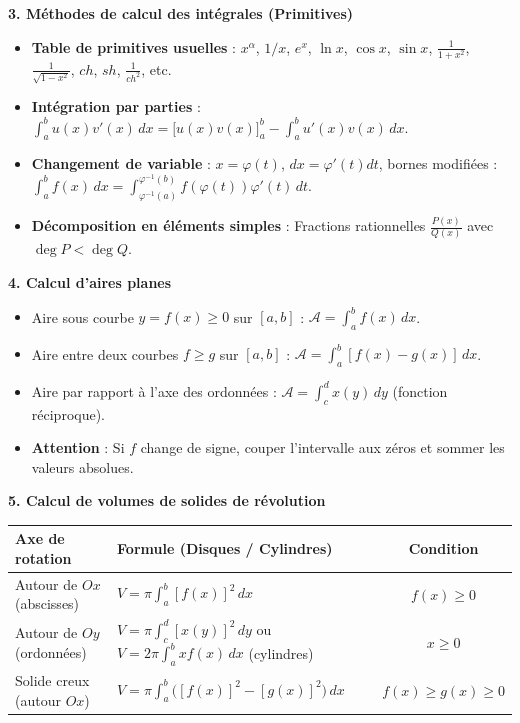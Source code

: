 \documentclass[11pt]{article}
\begin{document}
\begin{bilan}
\textbf{3. Méthodes de calcul des intégrales (Primitives)}
\begin{itemize}
    \item \textbf{Table de primitives usuelles} : $x^\alpha$, $1/x$, $e^x$, $\ln x$, $\cos x$, $\sin x$, $\frac{1}{1+x^2}$, $\frac{1}{\sqrt{1-x^2}}$, $ch$, $sh$, $\frac{1}{ch^2}$, etc.
    \item \textbf{Intégration par parties} : $\int_a^b u(x)v'(x)\,dx = \Big[u(x)v(x)\Big]_a^b - \int_a^b u'(x)v(x)\,dx$.
    \item \textbf{Changement de variable} : $x = \varphi(t)$, $dx = \varphi'(t)dt$, bornes modifiées : $\int_a^b f(x)\,dx = \int_{\varphi^{-1}(a)}^{\varphi^{-1}(b)} f(\varphi(t))\varphi'(t)\,dt$.
    \item \textbf{Décomposition en éléments simples} : Fractions rationnelles $\frac{P(x)}{Q(x)}$ avec $\deg P < \deg Q$.
\end{itemize}

\textbf{4. Calcul d'aires planes}
\begin{itemize}
    \item Aire sous courbe $y=f(x) \ge 0$ sur $[a,b]$ : $\mathcal{A} = \int_a^b f(x)\,dx$.
    \item Aire entre deux courbes $f \ge g$ sur $[a,b]$ : $\mathcal{A} = \int_a^b [f(x)-g(x)]\,dx$.
    \item Aire par rapport à l'axe des ordonnées : $\mathcal{A} = \int_c^d x(y)\,dy$ (fonction réciproque).
    \item \textbf{Attention} : Si $f$ change de signe, couper l'intervalle aux zéros et sommer les valeurs absolues.
\end{itemize}

\textbf{5. Calcul de volumes de solides de révolution}
\begin{center}
\begin{tabularx}{\linewidth}{|l|X|c|}\hline
\textbf{Axe de rotation} & \textbf{Formule (Disques / Cylindres)} & \textbf{Condition} \\ \hline
Autour de $Ox$ (abscisses) & $V = \pi \int_a^b [f(x)]^2\,dx$ & $f(x) \ge 0$ \\ \hline
Autour de $Oy$ (ordonnées) & $V = \pi \int_c^d [x(y)]^2\,dy$ ou $V = 2\pi \int_a^b x f(x)\,dx$ (cylindres) & $x \ge 0$ \\ \hline
Solide creux (autour $Ox$) & $V = \pi \int_a^b \big([f(x)]^2 - [g(x)]^2\big)\,dx$ & $f(x) \ge g(x) \ge 0$ \\ \hline
\end{tabularx}
\end{center}


\end{bilan}
\end{document}
